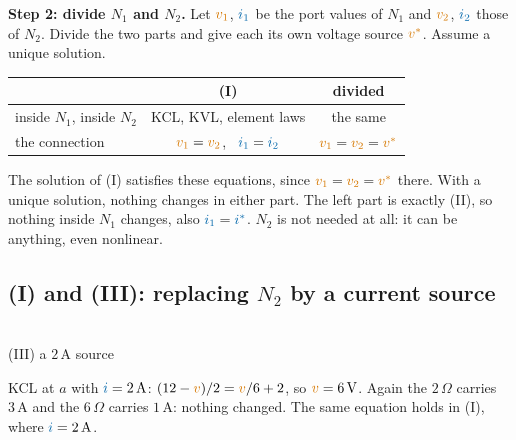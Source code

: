 \documentclass[11pt,a4paper]{article}
\newcommand{\Icol}[1]{\textcolor{ccur}{#1}}
\newcommand{\Vcol}[1]{\textcolor{cvolt}{#1}}
\newcommand{\uni}[1]{\,\mathrm{#1}}
\newcommand{\A}{\uni{A}}   \newcommand{\V}{\uni{V}}
\newcommand{\ohm}{\,\Omega}
\newcommand{\exN}[1]{%
  \draw[dashed, metugray, rounded corners=3pt] (-0.95,-0.4) rectangle (2.55,2.95);
  \node[font=\small, text=metugray, anchor=south west, inner sep=1pt] at (-0.95,2.97) {$N_1$};
  \draw (0,0) to[american voltage source, invert, l=$12\V$] (0,2);
  \draw (0,2) to[R, l=$2\ohm$] (2.0,2) -- (3.6,2);
  \draw (2.0,2) to[R, l_=$6\ohm$] (2.0,0);
  \draw (0,0) -- (3.6,0);
  \ifcase#1
    \draw (3.6,2) to[R, l=$3\ohm$] (3.6,0);
  \or
    \draw (3.6,0) to[american voltage source, invert, l_=$6\V$] (3.6,2);
  \or
    \draw (3.6,2) to[american current source, l=$2\A$] (3.6,0);
  \or
    \draw (3.6,2) to[R, l=$R_L$] (3.6,0);
  \fi
  \draw[fill=white] (2.85,2) circle (1.8pt) node[above=1pt, font=\small] {$a$};
  \draw[fill=white] (2.85,0) circle (1.8pt) node[below=1pt, font=\small] {$b$};}
\newcommand{\divNN}[1]{%
  \draw[elem] (0,0) rectangle (1.5,1.8); \node at (0.75,0.9) {$N_1$};
  \draw (1.5,1.5) -- (2.9,1.5); \draw (1.5,0.3) -- (2.9,0.3);
  \draw (5.1,1.5) -- (6.5,1.5); \draw (5.1,0.3) -- (6.5,0.3);
  \draw[elem] (6.5,0) rectangle (8.0,1.8); \node at (7.25,0.9) {$N_2$};
  \ifcase#1\or
    \draw (2.9,0.3) to[american voltage source, invert] (2.9,1.5);
    \draw (5.1,0.3) to[american voltage source, invert] (5.1,1.5);
    \node[font=\scriptsize, text=cvolt, right] at (3.2,0.9) {$v^*$};
    \node[font=\scriptsize, text=cvolt, left] at (4.8,0.9) {$v^*$};
  \or
    \draw (2.9,1.5) to[american current source] (2.9,0.3);
    \draw (5.1,0.3) to[american current source] (5.1,1.5);
    \node[font=\scriptsize, text=ccur, right] at (3.2,0.9) {$i^*$};
    \node[font=\scriptsize, text=ccur, left] at (4.8,0.9) {$i^*$};
  \fi
  \node[font=\scriptsize, text=cvolt] at (2.05,0.9) {$v_1$};
  \node[font=\scriptsize, text=ccur] at (2.05,1.75) {$i_1$};
  \node[font=\scriptsize, text=cvolt] at (5.95,0.9) {$v_2$};
  \node[font=\scriptsize, text=ccur] at (5.95,1.75) {$i_2$};}
\begin{document}
\textbf{Step 2: divide $N_1$ and $N_2$.} Let $\Vcol{v_1}$, $\Icol{i_1}$ be the port values of $N_1$ and
$\Vcol{v_2}$, $\Icol{i_2}$ those of $N_2$. Divide the two parts and give each its own voltage source
$\Vcol{v^*}$. Assume a unique solution.
\begin{center}
\quad
\footnotesize
\renewcommand{\arraystretch}{1.1}
\begin{tabular}{@{}l c c@{}}
\toprule
 & (I) & divided\\
\midrule
inside $N_1$, inside $N_2$ & KCL, KVL, element laws & the same\\
the connection & $\Vcol{v_1} = \Vcol{v_2}$, \ $\Icol{i_1} = \Icol{i_2}$ & $\Vcol{v_1} = \Vcol{v_2} = \Vcol{v^*}$\\
\bottomrule
\end{tabular}
\end{center}
The solution of (I) satisfies these equations, since $\Vcol{v_1} = \Vcol{v_2} = \Vcol{v^*}$ there.
With a unique solution, nothing changes in either part. The left part is exactly (II), so nothing
inside $N_1$ changes, also $\Icol{i_1} = \Icol{i^*}$. $N_2$ is not needed at all: it can be anything,
even nonlinear.

\subsection*{(I) and (III): replacing $N_2$ by a current source}

\begin{examplebox}
\begin{minipage}[c]{0.3\linewidth}
\centering
{}\\[-2pt]
{\scriptsize (III) a $2\A$ source}
\end{minipage}\hfill
\begin{minipage}[c]{0.68\linewidth}
\raggedright
KCL at $a$ with $\Icol{i} = 2\A$: $(12 - \Vcol{v})/2 = \Vcol{v}/6 + 2$, so $\Vcol{v} = 6\V$.
Again the $2\ohm$ carries $3\A$ and the $6\ohm$ carries $1\A$: nothing changed. The same
equation holds in (I), where $\Icol{i} = 2\A$.
\end{minipage}
\end{examplebox}
\end{document}
